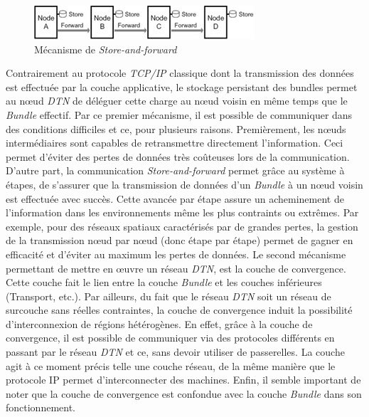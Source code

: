 \documentclass[conference]{IEEEtran}
\begin{document}
\begin{figure}[htbp]
\centerline{\includegraphics[scale=1.1]{Image2.jpg}}
\caption{Mécanisme de \emph{Store-and-forward} \cite{b7}}
\label{fig:store-and-forward}
\end{figure}
Contrairement au protocole \emph{TCP/IP} classique dont la transmission des données est effectuée par la couche applicative, le stockage persistant des bundles permet au nœud \emph{DTN} de déléguer cette charge au nœud voisin en même temps que le \emph{Bundle} effectif.
Par ce premier mécanisme, il est possible de communiquer dans des conditions difficiles et ce, pour plusieurs raisons. Premièrement, les nœuds intermédiaires sont capables de retransmettre directement l’information. Ceci permet d’éviter des pertes de données très coûteuses lors de la communication.
D’autre part, la communication \emph{Store-and-forward} permet grâce au système à étapes, de s’assurer que la transmission de données d’un \emph{Bundle} à un nœud voisin est effectuée avec succès. Cette avancée par étape assure un acheminement de l’information dans les environnements même les plus contraints ou extrêmes. Par exemple, pour des réseaux spatiaux caractérisés par de grandes pertes, la gestion de la transmission nœud par nœud (donc étape par étape) permet de gagner en efficacité et d’éviter au maximum les pertes de données.
Le second mécanisme permettant de mettre en œuvre un réseau \emph{DTN}, est la couche de
convergence. Cette couche fait le lien entre la couche \emph{Bundle} et les couches inférieures
(Transport, etc.). Par ailleurs, du fait que le réseau \emph{DTN} soit un réseau de surcouche sans réelles contraintes, la couche de convergence induit la possibilité d’interconnexion de régions hétérogènes.
En effet, grâce à la couche de convergence, il est possible de communiquer via des protocoles différents en passant par le réseau \emph{DTN} et ce, sans devoir utiliser de passerelles. La couche agit à ce moment précis telle une couche réseau, de la même manière que le protocole IP permet d’interconnecter des machines. Enfin, il semble important de noter que la couche de convergence est confondue avec la couche \emph{Bundle} dans son fonctionnement.
\end{document}
